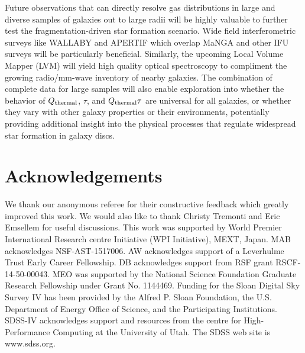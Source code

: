 \documentclass[fleqn,usenatbib]{mnras}
\newcommand{\qh}{Q_{\rm thermal}}
\begin{document}
{Future observations that can directly resolve gas distributions in large and diverse samples of galaxies out to large radii will be highly valuable to further test the fragmentation-driven star formation scenario.  Wide field interferometric surveys like WALLABY and APERTIF which overlap MaNGA and other IFU surveys will be particularly beneficial. Similarly, the upcoming Local Volume Mapper (LVM) will yield high quality optical spectroscopy to compliment the growing radio/mm-wave inventory of nearby galaxies. The combination of complete data for large samples will also enable exploration into whether the behavior of $\qh$, $\tau$, and $\qh\tau$ are universal for all galaxies, or whether they vary with other galaxy properties or their environments, potentially providing additional insight into the physical processes that regulate widespread star formation in galaxy discs.


\section*{Acknowledgements}
We thank our anonymous referee for their constructive feedback which greatly improved this work. We would also like to
thank Christy Tremonti and Eric Emsellem for useful discussions. This
work was supported by World Premier International Research centre
Initiative (WPI Initiative), MEXT, Japan. MAB acknowledges NSF-AST-1517006. AW acknowledges
support of a Leverhulme Trust Early Career Fellowship. DB acknowledges support from RSF grant RSCF-14-50-00043. MEO was supported by the National Science Foundation Graduate Research Fellowship under Grant No. 1144469. Funding for the
Sloan Digital Sky Survey IV has been provided by the Alfred P. Sloan
Foundation, the U.S. Department of Energy Office of Science, and the
Participating Institutions. SDSS-IV acknowledges support and resources
from the centre for High-Performance Computing at the University of
Utah. The SDSS web site is www.sdss.org.

}
\end{document}
